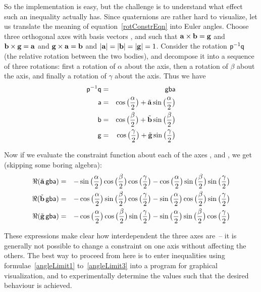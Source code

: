 So the implementation is easy, but the challenge is to understand what effect such an inequality
actually has. Since quaternions are rather hard to visualize, let us translate the meaning of
equation~\ref{rotConstrEqn} into Euler angles. Choose three orthogonal axes with basis vectors
,  and  such that $\ve{a}\times\ve{b}=\ve{g}$ and $\ve{b}\times\ve{g}=\ve{a}$
and $\ve{g}\times\ve{a}=\ve{b}$ and $\norm{\ve{a}} = \norm{\ve{b}} = \norm{\ve{g}} = 1$.
Consider the rotation $\mathsf{p}^{-1}\mathsf{q}$ (the relative rotation between the two bodies), and
decompose it into a sequence of three rotations: first a rotation of $\alpha$ about the 
axis, then a rotation of $\beta$ about the  axis, and finally a rotation of $\gamma$ about
the  axis. Thus we have
\begin{eqnarray}
\q{p}^{-1}\q{q} &=& \q{g}\q{b}\q{a} \\
\q{a} &=& \cos\big(\frac{\alpha}{2}\big) + \tilde{\ve{a}}\sin\big(\frac{\alpha}{2}\big) \\
\q{b} &=& \cos\big(\frac{\beta }{2}\big) + \tilde{\ve{b}}\sin\big(\frac{\beta }{2}\big) \\
\q{g} &=& \cos\big(\frac{\gamma}{2}\big) + \tilde{\ve{g}}\sin\big(\frac{\gamma}{2}\big)
\end{eqnarray}

Now if we evaluate the constraint function about each of the axes ,  and , we
get (skipping some boring algebra):
\begin{eqnarray}
\Re(\tilde{\ve{a}}\,\q{g}\q{b}\q{a}) &=& -\sin\big(\frac{\alpha}{2}\big)
     \cos\big(\frac{\beta }{2}\big)   \cos\big(\frac{\gamma}{2}\big)
    -\cos\big(\frac{\alpha}{2}\big)   \sin\big(\frac{\beta }{2}\big)
     \sin\big(\frac{\gamma}{2}\big)   \label{angleLimit1}\\
\Re(\tilde{\ve{b}}\,\q{g}\q{b}\q{a}) &=& -\cos\big(\frac{\alpha}{2}\big)
     \sin\big(\frac{\beta }{2}\big)   \cos\big(\frac{\gamma}{2}\big)
    -\sin\big(\frac{\alpha}{2}\big)   \cos\big(\frac{\beta }{2}\big)
     \sin\big(\frac{\gamma}{2}\big)   \label{angleLimit2}\\
\Re(\tilde{\ve{g}}\,\q{g}\q{b}\q{a}) &=& -\cos\big(\frac{\alpha}{2}\big)
     \cos\big(\frac{\beta }{2}\big)   \sin\big(\frac{\gamma}{2}\big)
    -\sin\big(\frac{\alpha}{2}\big)   \sin\big(\frac{\beta }{2}\big)
     \cos\big(\frac{\gamma}{2}\big)   \label{angleLimit3}
\end{eqnarray}

These expressions make clear how interdependent the three axes are~-- it is generally not
possible to change a constraint on one axis without affecting the others. The best way to proceed
from here is to enter inequalities using formulae~\ref{angleLimit1} to~\ref{angleLimit3} into
a program for graphical visualization, and to experimentally determine the values such that the
desired behaviour is achieved.


